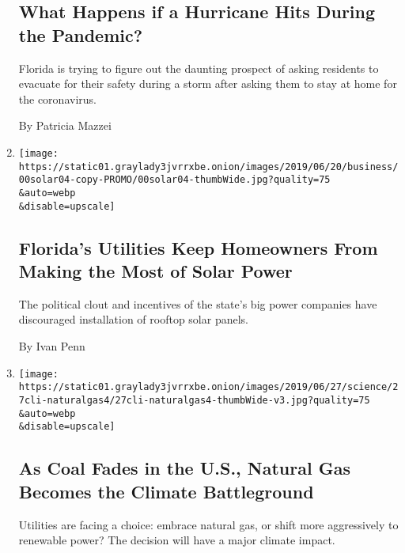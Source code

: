 \begin{enumerate}
{  \subsection{What Happens if a Hurricane Hits During the
  Pandemic?}\label{what-happens-if-a-hurricane-hits-during-the-pandemic}}

  Florida is trying to figure out the daunting prospect of asking
  residents to evacuate for their safety during a storm after asking
  them to stay at home for the coronavirus.

  By Patricia Mazzei
\item
  \href{/2019/07/07/business/energy-environment/florida-solar-power.html}{}

  \texttt{[image: https://static01.graylady3jvrrxbe.onion/images/2019/06/20/business/00solar04-copy-PROMO/00solar04-thumbWide.jpg?quality=75\\\&auto=webp\\\&disable=upscale]}

  \hypertarget{floridas-utilities-keep-homeowners-from-making-the-most-of-solar-power}{%
  \subsection{Florida's Utilities Keep Homeowners From Making the Most
  of Solar
  Power}\label{floridas-utilities-keep-homeowners-from-making-the-most-of-solar-power}}

  The political clout and incentives of the state's big power companies
  have discouraged installation of rooftop solar panels.

  By Ivan Penn
\item
  \href{/2019/06/26/climate/natural-gas-renewables-fight.html}{}

  \texttt{[image: https://static01.graylady3jvrrxbe.onion/images/2019/06/27/science/27cli-naturalgas4/27cli-naturalgas4-thumbWide-v3.jpg?quality=75\\\&auto=webp\\\&disable=upscale]}

  \hypertarget{as-coal-fades-in-the-us-natural-gas-becomes-the-climate-battleground}{%
  \subsection{As Coal Fades in the U.S., Natural Gas Becomes the Climate
  Battleground}\label{as-coal-fades-in-the-us-natural-gas-becomes-the-climate-battleground}}

  Utilities are facing a choice: embrace natural gas, or shift more
  aggressively to renewable power? The decision will have a major
  climate impact.


\end{enumerate}
